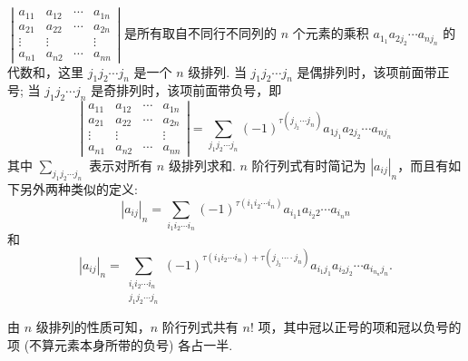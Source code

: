 \begin{definition}
    $~ \left|\begin{array}{cccc}a_{11} & a_{12} & \cdots & a_{1 n} \\ a_{21} & a_{22} & \cdots & a_{2 n} \\ \vdots & \vdots & & \vdots \\ a_{n 1} & a_{n 2} & \cdots & a_{n n}\end{array}\right| $
    是所有取自不同行不同列的 $ n $ 个元素的乘积 $ a_{1_{1}} a_{2 j_{2}} \cdots a_{n j_{n}} $ 的代数和，这里 $ j_{1} j_{2} \cdots j_{n} $ 是一个 $ n $ 级排列.
    当 $ j_{1} j_{2} \cdots j_{n} $ 是偶排列时，该项前面带正号; 当 $ j_{1} j_{2} \cdots j_{n} $ 是奇排列时，该项前面带负号，即
    $$\left|\begin{array}{cccc}
            a_{11}  & a_{12}  & \cdots & a_{1 n} \\
            a_{21}  & a_{22}  & \cdots & a_{2 n} \\
            \vdots  & \vdots  &        & \vdots  \\
            a_{n 1} & a_{n 2} & \cdots & a_{n n}
        \end{array}\right|=\sum_{j_{1} j_{2} \cdots j_{n}}(-1)^{\tau\left(j_{j_{2}} \cdots j_{n}\right)} a_{1 j_{1}} a_{2 j_{2}} \cdots a_{n j_{n}}$$
    其中 $ \displaystyle\sum_{j_{1} j_{2} \cdots j_{n}} $ 表示对所有 $ n $ 级排列求和. $ n $ 阶行列式有时简记为 $ \left|a_{i j}\right|_{n} $，而且有如下另外两种类似的定义:
    $$\left|a_{i j}\right|_{n}=\sum_{i_{1} i_{2} \cdots i_{n}}(-1)^{\tau\left(i_{1} i_{2} \cdots i_{n}\right)} a_{i_{1} 1} a_{i_{2} 2} \cdots a_{i_{n} n}$$
    和 $$\left|a_{i j}\right|_{n}=\sum_{\substack{i_{i} i_{2} \cdots i_{n} \\  j_{1} j_{2} \cdots j_{n}}}(-1)^{\tau\left(i_{1} i_{2} \cdots i_{n}\right)+\tau\left(j_{j_{2}} \cdots \cdot j_{n}\right)} a_{i_{1} j_{1}} a_{i_{2} j_{2}} \cdots a_{i_{n_{n}} j_{n}} .$$
\end{definition}

由 $ n $ 级排列的性质可知，$n $ 阶行列式共有 $ n! $ 项，其中冠以正号的项和冠以负号的项 (不算元素本身所带的负号) 各占一半.


